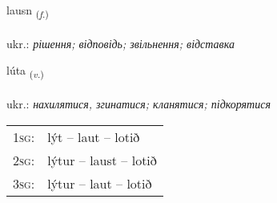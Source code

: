 \documentclass[frontgrid, backgrid]{flacards}\usepackage[]{graphicx}\usepackage[]{xcolor}
\begin{document}
\renewcommand{\blhead}{\vskip5pt {\small\bfseries\footnotesize Nafnorð | іменник }}
\renewcommand{\bcfoot}{\vskip5pt \hspace{2pt}{\small\bfseries\footnotesize 2K}}


{lausn \small{\textsubscript{(\textit{f.})}} \\[1ex] %
\textphonetic{[lœistn̥]} \\
ukr.: \emph{рішення; відповідь; звільнення; відставка} \\  [2ex]
\renewcommand*{\arraystretch}{0.8}
}

\renewcommand{\flhead}{\vskip5pt \fboxsep=0pt {\small\bfseries\footnotesize Sagnorð | дієслово}}
\renewcommand{\fcfoot}{\vskip5pt \fboxsep=0pt \hspace{2pt}{\small\bfseries\footnotesize 2K}}

\renewcommand{\blhead}{\vskip5pt {\small\bfseries\footnotesize Sagnorð | дієслово }}
\renewcommand{\bcfoot}{\vskip5pt \hspace{2pt}{\small\bfseries\footnotesize 2K}}


{lúta \small{\textsubscript{(\textit{v.})}} \\[1ex] %
\textphonetic{[luːta]} \\
ukr.: \emph{нахилятися, згинатися; кланятися; підкорятися} \\  [2ex]
\renewcommand*{\arraystretch}{0.8}
\begin{tabular}{p{1cm}l}
\textsc{1sg}: & lýt -- laut -- lotið \\ 
\textsc{2sg}: & lýtur -- laust -- lotið \\ 
\textsc{3sg}: & lýtur -- laut -- lotið \\ 
\end{tabular}
}
\end{document}
